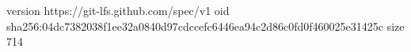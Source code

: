 version https://git-lfs.github.com/spec/v1
oid sha256:04dc7382038f1ee32a0840d97cdccefc6446ea94c2d86c0fd0f460025e31425c
size 714
